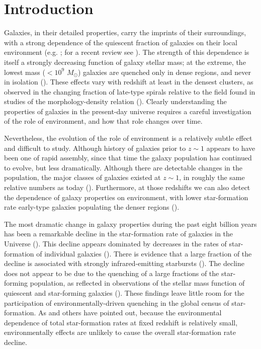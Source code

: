 \documentclass{emulateapj}
\begin{document}
\section{Introduction}
Galaxies, in their detailed properties, carry the imprints of their
surroundings, with a strong dependence of the quiescent fraction of
galaxies on their local environment (e.g. \citealt{hubble36a,
oemler74a, dressler80a, hermit96a, guzzo97a}; for a recent review see
\citealt{blanton09a}).  The strength of this dependence is itself a
strongly decreasing function of galaxy stellar mass; at the extreme,
the lowest mass ($<10^{9}$ $M_\odot$) galaxies are quenched only in
dense regions, and never in isolation (\citealt{geha12a}).  These
effects vary with redshift at least in the densest clusters, as
observed in the changing fraction of late-type spirals relative to the
field found in studies of the morphology-density relation
(\citealt{dressler84a, desai07a}).  Clearly understanding the
properties of galaxies in the present-day universe requires a careful
investigation of the role of environment, and how that role changes
over time.

Nevertheless, the evolution of the role of environment is a relatively
subtle effect and difficult to study.  Although history of galaxies
prior to $z\sim 1$ appears to have been one of rapid assembly, since
that time the galaxy population has continued to evolve, but less
dramatically. Although there are detectable changes in the population,
the major classes of galaxies existed at $z\sim 1$, in roughly the
same relative numbers as today (\citealt{bundy06a, borch06a,
taylor09a, Moustakas:2013aa}). Furthermore, at those redshifts we can also
detect the dependence of galaxy properties on environment, with lower
star-formation rate early-type galaxies populating the denser regions
(\citealt{cooper08a, patel09a, kovac10a}).

The most dramatic change in galaxy properties during the past eight
billion years has been a remarkable decline in the star-formation rate
of galaxies in the Universe (\citealt{hopkins06a}).  This decline
appears dominated by decreases in the rates of star-formation of
individual galaxies (\cite{Noeske:2007aa}). There is evidence that a
large fraction of the decline is associated with strongly
infrared-emitting starbursts (\citealt{bell05a, magnelli09a}).  The
decline does not appear to be due to the quenching of a large
fractions of the star-forming population, as reflected in observations
of the stellar mass function of quiescent and star-forming galaxies
(\citealt{Blanton:2006aa, bundy06a, borch06a, Moustakas:2013aa}).  These
findings leave little room for the participation of
environmentally-driven quenching in the global census of
star-formation.  As \citet{cooper08a} and others have pointed out,
because the environmental dependence of total star-formation rates at
fixed redshift is relatively small, environmentally effects are
unlikely to cause the overall star-formation rate decline.
\end{document}
